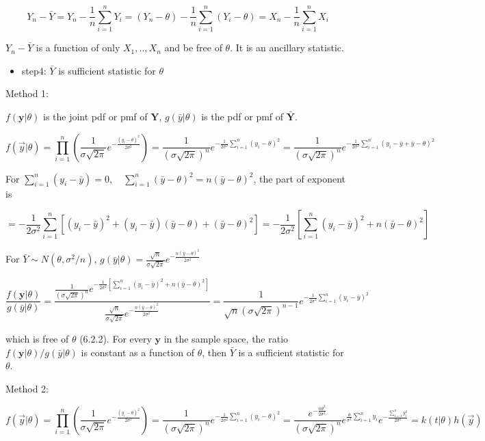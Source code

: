 \documentclass[12pt,]{article}
\providecommand{\tightlist}{%
  \setlength{\itemsep}{0pt}\setlength{\parskip}{0pt}}
\begin{document}
\[Y_n-\bar Y=Y_n-\frac1{n}\sum_{i=1}^nY_i=(Y_n-\theta)-\frac1{n}\sum_{i=1}^n(Y_i-\theta)= X_n-\frac1{n}\sum_{i=1}^nX_i\]

\(Y_n-\bar Y\) is a function of only \(X_1,..,X_n\) and be free of
\(\theta\). It is an ancillary statistic.

\begin{itemize}
\tightlist
\item
  step4: \(\bar Y\) is sufficient statistic for \(\theta\)
\end{itemize}

Method 1:

\(f(\mathbf{y}|\theta)\) is the joint pdf or pmf of \(\mathbf{Y}\),
\(g(\bar y|\theta)\) is the pdf or pmf of \(\bar{\mathbf{Y}}\).

\[f(\vec{y}|\theta)=\prod_{i=1}^n(\frac1{\sigma\sqrt{2\pi}}e^{-\frac{(y_i-\theta)^2}{2\sigma^2}})=\frac1{(\sigma\sqrt{2\pi})^n}e^{-\frac{1}{2\sigma^2}\sum_{i=1}^n(y_i-\theta)^2}=\frac1{(\sigma\sqrt{2\pi})^n}e^{-\frac{1}{2\sigma^2}\sum_{i=1}^n(y_i-\bar y+\bar y-\theta)^2}\]

For
\(\sum_{i=1}^n(y_i-\bar y)=0,\quad\sum_{i=1}^n(\bar y-\theta)^2=n(\bar y-\theta)^2\),
the part of exponent is

\[=-\frac{1}{2\sigma^2}\sum_{i=1}^n[(y_i-\bar y)^2+(y_i-\bar y)(\bar y-\theta)+(\bar y-\theta)^2]=-\frac{1}{2\sigma^2}[\sum_{i=1}^n(y_i-\bar y)^2+n(\bar y-\theta)^2]\]

For \(\bar Y\sim N(\theta,\sigma^2/n)\),
\(g(\bar y|\theta)=\frac{\sqrt{n}}{\sigma\sqrt{2\pi}}e^{-\frac{n(\bar y-\theta)^2}{2\sigma^2}}\)

\[\frac{f(\mathbf{y}|\theta)}{g(\bar y|\theta)}=\frac{\frac1{(\sigma\sqrt{2\pi})^n}e^{-\frac{1}{2\sigma^2}[\sum_{i=1}^n(y_i-\bar y)^2+n(\bar y-\theta)^2]}}{\frac{\sqrt{n}}{\sigma\sqrt{2\pi}}e^{-\frac{n(\bar y-\theta)^2}{2\sigma^2}}}=\frac1{\sqrt{n}(\sigma\sqrt{2\pi})^{n-1}}e^{-\frac{1}{2\sigma^2}\sum_{i=1}^n(y_i-\bar y)^2}\]

which is free of \(\theta\) (6.2.2). For every \(\mathbf{y}\) in the
sample space, the ratio \(f(\mathbf{y}|\theta)/g(\bar y|\theta)\) is
constant as a function of \(\theta\), then \(\bar{Y}\) is a sufficient
statistic for \(\theta\).

Method 2:

\[f(\vec{y}|\theta)=\prod_{i=1}^n(\frac1{\sigma\sqrt{2\pi}}e^{-\frac{(y_i-\theta)^2}{2\sigma^2}})=\frac1{(\sigma\sqrt{2\pi})^n}e^{-\frac{1}{2\sigma^2}\sum_{i=1}^n(y_i-\theta)^2}=\frac{e^{-\frac{n\theta^2}{2\sigma^2}}}{(\sigma\sqrt{2\pi})^n}e^{\frac{\theta}{\sigma^2}\sum_{i=1}^ny_i}e^{-\frac{\sum_{i=1}^ny_i^2}{2\sigma^2}}=k(t|\theta)h(\vec y)\]
\end{document}

